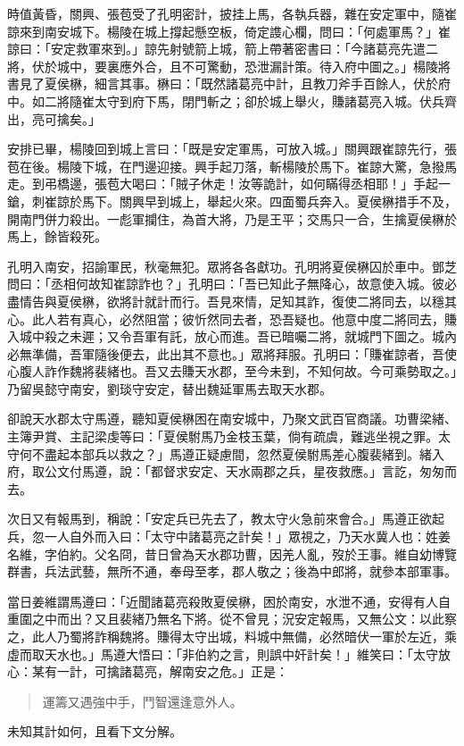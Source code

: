 時值黃昏，關興、張苞受了孔明密計，披挂上馬，各執兵器，雜在安定軍中，隨崔諒來到南安城下。楊陵在城上撐起懸空板，倚定謢心欄，問曰：「何處軍馬？」崔諒曰：「安定救軍來到。」諒先射號箭上城，箭上帶著密書曰：「今諸葛亮先遣二將，伏於城中，要裏應外合，且不可驚動，恐泄漏計策。待入府中圖之。」楊陵將書見了夏侯楙，細言其事。楙曰：「既然諸葛亮中計，且教刀斧手百餘人，伏於府中。如二將隨崔太守到府下馬，閉門斬之；卻於城上舉火，賺諸葛亮入城。伏兵齊出，亮可擒矣。」

安排已畢，楊陵回到城上言曰：「既是安定軍馬，可放入城。」關興跟崔諒先行，張苞在後。楊陵下城，在門邊迎接。興手起刀落，斬楊陵於馬下。崔諒大驚，急撥馬走。到弔橋邊，張苞大喝曰：「賊子休走！汝等詭計，如何瞞得丞相耶！」手起一鎗，刺崔諒於馬下。關興早到城上，舉起火來。四面蜀兵奔入。夏侯楙措手不及，開南門併力殺出。一彪軍攔住，為首大將，乃是王平；交馬只一合，生擒夏侯楙於馬上，餘皆殺死。

孔明入南安，招諭軍民，秋毫無犯。眾將各各獻功。孔明將夏侯楙囚於車中。鄧芝問曰：「丞相何故知崔諒詐也？」孔明曰：「吾已知此子無降心，故意使入城。彼必盡情告與夏侯楙，欲將計就計而行。吾見來情，足知其詐，復使二將同去，以穩其心。此人若有真心，必然阻當；彼忻然同去者，恐吾疑也。他意中度二將同去，賺入城中殺之未遲；又令吾軍有託，放心而進。吾已暗囑二將，就城門下圖之。城內必無準備，吾軍隨後便去，此出其不意也。」眾將拜服。孔明曰：「賺崔諒者，吾使心腹人詐作魏將裴緒也。吾又去賺天水郡，至今未到，不知何故。今可乘勢取之。」乃留吳懿守南安，劉琰守安定，替出魏延軍馬去取天水郡。

卻說天水郡太守馬遵，聽知夏侯楙困在南安城中，乃聚文武百官商議。功曹梁緒、主簿尹賞、主記梁虔等曰：「夏侯駙馬乃金枝玉葉，倘有疏虞，難逃坐視之罪。太守何不盡起本部兵以救之？」馬遵正疑慮間，忽然夏侯駙馬差心腹裴緒到。緒入府，取公文付馬遵，說：「都督求安定、天水兩郡之兵，星夜救應。」言訖，匆匆而去。

次日又有報馬到，稱說：「安定兵已先去了，教太守火急前來會合。」馬遵正欲起兵，忽一人自外而入曰：「太守中諸葛亮之計矣！」眾視之，乃天水冀人也：姓姜名維，字伯約。父名冏，昔日曾為天水郡功曹，因羌人亂，歿於王事。維自幼博覽群書，兵法武藝，無所不通，奉母至孝，郡人敬之；後為中郎將，就參本部軍事。

當日姜維謂馬遵曰：「近聞諸葛亮殺敗夏侯楙，困於南安，水泄不通，安得有人自重圍之中而出？又且裴緒乃無名下將。從不曾見；況安定報馬，又無公文：以此察之，此人乃蜀將詐稱魏將。賺得太守出城，料城中無備，必然暗伏一軍於左近，乘虛而取天水也。」馬遵大悟曰：「非伯約之言，則誤中奸計矣！」維笑曰：「太守放心：某有一計，可擒諸葛亮，解南安之危。」正是：

\begin{quote}
運籌又遇強中手，鬥智還逢意外人。
\end{quote}

未知其計如何，且看下文分解。

